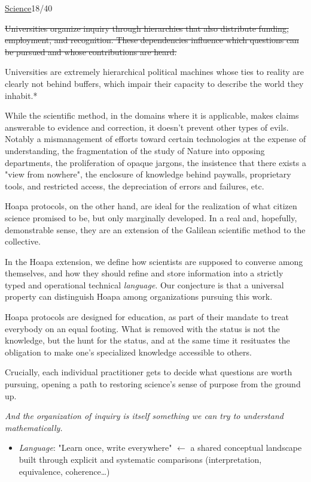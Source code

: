 \documentclass[a4paper,10pt]{article}
\newcommand{\slidehead}[2]{\par\addvspace{7pt}\noindent\underline{#1}\hfill{\color{gray}#2}\par\nopagebreak\vspace{1pt}}
\newcommand{\transition}[1]{\par{\color{black!70}\emph{#1}}\par}
\begin{document}
\slidehead{Science}{18/40}
\sout{Universities organize inquiry through hierarchies that also distribute funding, employment, and recognition. These dependencies influence which questions can be pursued and whose contributions are heard.}\par
Universities are extremely hierarchical political machines whose ties to reality are clearly not behind buffers, which impair their capacity to describe the world they inhabit.*\par
While the scientific method, in the domains where it is applicable, makes claims answerable to evidence and correction, it doesn't prevent other types of evils. Notably a mismanagement of efforts toward certain technologies at the expense of understanding, the fragmentation of the study of Nature into opposing departments, the proliferation of opaque jargons, the insistence that there exists a "view from nowhere", the enclosure of knowledge behind paywalls, proprietary tools, and restricted access, the depreciation of errors and failures, etc.\par
Hoapa protocols, on the other hand, are ideal for the realization of what citizen science promised to be, but only marginally developed. In a real and, hopefully, demonstrable sense, they are an extension of the Galilean scientific method to the collective.\par
In the Hoapa extension, we define how scientists are supposed to converse among themselves, and how they should refine and store information into a strictly typed and operational technical \textcolor{languageamethyst}{\emph{language}}. Our conjecture is that a universal property can distinguish Hoapa among organizations pursuing this work.\par
Hoapa protocols are designed for education, as part of their mandate to treat everybody on an equal footing. What is removed with the status is not the knowledge, but the hunt for the status, and at the same time it resituates the obligation to make one's specialized knowledge accessible to others.\par
Crucially, each individual practitioner gets to decide what questions are worth pursuing, opening a path to restoring science’s sense of purpose from the ground up.\par
\transition{And the organization of inquiry is itself something we can try to understand mathematically.}
\begin{itemize}
\item \textcolor{languageamethyst}{\emph{Language}}: "Learn once, write everywhere" \ensuremath{\leftarrow} a shared conceptual landscape built through explicit and systematic comparisons (interpretation, equivalence, coherence…)
\end{itemize}
\end{document}
